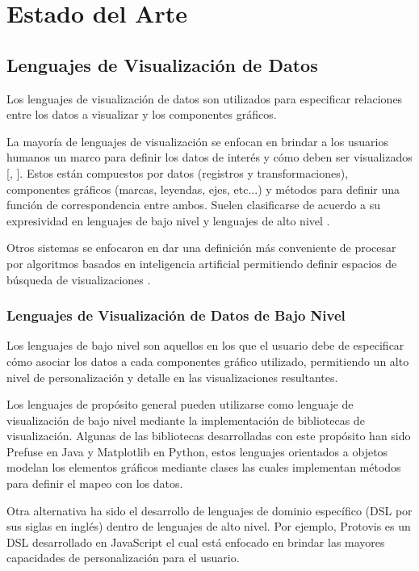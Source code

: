\chapter{Estado del Arte}\label{chapter:state-of-the-art}

\section{Lenguajes de Visualizaci\'on de Datos}
Los lenguajes de visualizaci\'on de datos son utilizados para especificar
relaciones entre los datos a visualizar y los componentes gr\'aficos.

La mayor\'ia de lenguajes de visualizaci\'on se enfocan en brindar a los usuarios humanos
un marco para definir los datos de inter\'es y c\'omo deben ser visualizados [\cite*{li2018echarts}, \cite*{tableau}]. 
Estos est\'an compuestos por datos (registros y transformaciones), 
componentes gr\'aficos (marcas, leyendas, ejes, etc...) y
m\'etodos para definir una funci\'on de correspondencia entre ambos. Suelen clasificarse
de acuerdo a su expresividad en lenguajes de bajo nivel y lenguajes de alto nivel \cite{qin2020making}.

Otros sistemas se enfocaron en dar una definici\'on m\'as conveniente de procesar
por algoritmos basados en inteligencia artificial permitiendo definir espacios de b\'usqueda de
visualizaciones \cite{godfrey2016interactive}.


\subsection{Lenguajes de Visualizaci\'on de Datos de Bajo Nivel}
Los lenguajes de bajo nivel son aquellos en los que el usuario debe de especificar c\'omo asociar los
datos a cada componentes gr\'afico utilizado, permitiendo un alto nivel de personalizaci\'on y detalle en
las visualizaciones resultantes.

Los lenguajes de prop\'osito general pueden utilizarse como lenguaje de visualizaci\'on de bajo nivel
mediante la implementaci\'on de bibliotecas de visualizaci\'on. Algunas de las bibliotecas desarrolladas
con este prop\'osito han sido Prefuse \cite{heer2005prefuse} en Java y Matplotlib \cite{matplotlib} en Python,
estos lenguajes orientados a objetos modelan
los elementos gr\'aficos mediante clases las cuales implementan m\'etodos para definir el mapeo con los datos.

Otra alternativa ha sido el desarrollo de lenguajes
de dominio espec\'ifico (DSL por sus siglas en ingl\'es) dentro de lenguajes de alto nivel. Por ejemplo,
Protovis \cite{bostock2009protovis} es un DSL desarrollado en JavaScript 
el cual est\'a enfocado en brindar las mayores capacidades de personalizaci\'on para el usuario.

